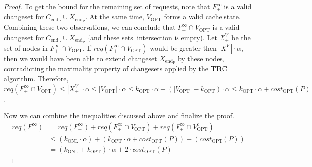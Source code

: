 \begin{proof}
To get the bound for the remaining set of requests, note that $F^{\infty}_{+}$ is a valid
changeset for $C_{\mathrm{end_P}} \cup X_{\mathrm{end_P}}$. At the same time,
$V_{\mathrm{OPT}}$ forms a valid cache state. Combining these two observations,
we can conclude that $F^{\infty}_{+} \cap V_{\mathrm{OPT}}$ is a valid
changeset for $C_{\mathrm{end_P}} \cup X_{\mathrm{end_P}}$ (and these sets'
intersection is empty). Let $X^{V}_{+}$ be the set of nodes in $F^{\infty}_{+}
\cap V_{\mathrm{OPT}}$. If $req(F^{\infty}_{+} \cap V_{\mathrm{OPT}})$ would be
greater then $|X^{V}_{+}| \cdot \alpha$, then we would have been able to extend
changeset $X_{\mathrm{end_P}}$ by these nodes, contradicting the maximality
property of changesets applied by the \textbf{TRC} algorithm.  Therefore,
$req(F^{\infty}_{+} \cap V_{\mathrm{OPT}}) \leq |X^{V}_{+}| \cdot \alpha \leq
|V_{\mathrm{OPT}}| \cdot \alpha \leq k_{\mathrm{OPT}} \cdot \alpha +
(|V_{\mathrm{OPT}}| - k_{\mathrm{OPT}}) \cdot \alpha \leq k_{\mathrm{OPT}} \cdot \alpha +
cost_{\mathrm{OPT}}(P)$.

Now we can combine the inequalities discussed above and finalize the proof.
\begin{equation*} \begin{split} req(F^{\infty}) & = req(F^{\infty}_{-}) +
req(F^{\infty}_{+} \cap V_{\mathrm{OPT}}) + req(F^{\infty}_{+} \cap
V_{\mathrm{OPT}}^c) \\ & \leq (k_{\mathrm{ONL}} \cdot \alpha) +
(k_{\mathrm{OPT}} \cdot \alpha + cost_{\mathrm{OPT}}(P)) +
(cost_{\mathrm{OPT}}(P)) \\ & = (k_{\mathrm{ONL}} + k_{\mathrm{OPT}}) \cdot
\alpha + 2 \cdot cost_{\mathrm{OPT}}(P) \end{split} \end{equation*} \end{proof}

